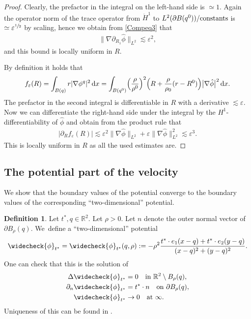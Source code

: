 \documentclass[10pt]{amsart}
\let\epsilon\varepsilon
\let\backslash\setminus
\newcommand{\constants}{\textup{constants}}
\theoremstyle{definition}
\newtheorem{definition}[theorem]{Definition}
\newcommand\R{\mathbb{R}}
\newcommand\bnorm[1]{\bigl\lVert #1\bigr\rVert}
\newcommand\eq{=}
\newcommand\dd{\,\mathrm{d}}
\newcommand\dx{\dd x}
\let\chek\widecheck
\let\de\partial
\let\eps\epsilon
\begin{document}
\begin{proof}
Clearly, the prefactor in the integral on the left-hand side is $\simeq 1$. Again the operator norm of the trace operator from $\dot{H}^1$ to $L^2(\de B(q^0))/\constants$ is $\simeq \eps^{\sfrac{1}{2}}$ by scaling, hence we obtain from \eqref{Compeq3} that
\begin{align*}
\bnorm{\nabla \de_{R_1}\hat{\phi}}_{L^2}\lesssim \eps^2,
\end{align*}
and this bound is locally uniform in $R$.

By definition it holds that
\begin{align*}
f_\eps(R)\eq\int_{B(q)} r|\nabla \phi^q|^2\dx\eq \int_{B(q^0)}\Bigl(\frac{\rho}{\rho^0}\Bigr)^2\Bigl(R+\frac{\rho}{\rho_0}(r-R^0)\Bigr) \bigl|\nabla\hat{\phi}\bigr|^2\dx.
\end{align*}
The prefactor in the second integral is differentiable in $R$ with a derivative $\lesssim \eps$. Now we can differentiate the right-hand side under the integral by the $H^1$-differentiability of $\hat{\phi}$ and obtain from the product rule that
\begin{align*}
|\de_Rf_\eps(R)|\lesssim \eps^2\bnorm{\nabla\hat{\phi}}_{L^2}+\eps\bnorm{\nabla\hat{\phi}}_{L^2}^2\lesssim \eps^3.
\end{align*}
This is locally uniform in $R$ as all the used estimates are.
\end{proof}

\subsection{The potential part of the velocity}
We show that the boundary values of the potential converge to the boundary values of the corresponding ``two-dimensional'' potential.

 \label{sing body subsec}
\begin{definition}\label{def flat func}
Let $t^*,q\in \R^2$. Let $\rho>0$. Let $n$ denote the outer normal vector of $\de B_\rho(q)$. We~define a ``two-dimensional'' potential
\begin{align*}
\chek{\phi}_{t^*}\eq\chek{\phi}_{t^*}(q,\rho):=-\rho^2\frac{t^*\cdot e_1(x-q)+t^*\cdot e_2(y-q)}{(x-q)^2+(y-q)^2}.
\end{align*}
One can check that this is the solution of
\begin{align}
\Delta \chek{\phi}_{t^*}&\eq0\quad\text{in $\mathbb{R}^2\backslash B_\rho(q)$}\label{Pot1},\\
\de_n\chek{\phi}_{t^*}&\eq t^*\cdot n \quad\text{on $\de B_\rho(q)$}\label{Pot2},\\
\chek{\phi}_{t^*}&\to 0 \quad\text{at $\infty$}.\label{Pot3}
\end{align}
Uniqueness of this can be found \eg in \cite[Th.\,3.1]{Amrouche}.
\end{definition}
\end{document}
